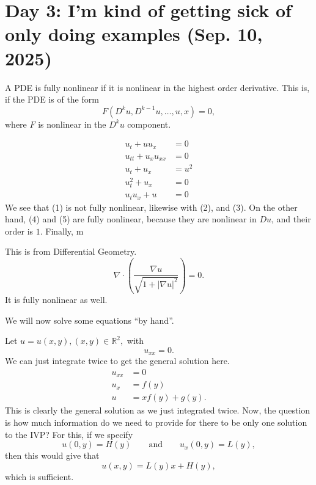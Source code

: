 \section{Day 3: I'm kind of getting sick of only doing examples (Sep. 10, 2025)}
\begin{definition}
	A PDE is fully nonlinear if it is nonlinear in the highest order derivative. This is, if the PDE is of the form
	\[ F(D^{k}u, D^{k-1}u, \ldots, u, x) = 0, \]
	where \( F \) is nonlinear in the \( D^{k}u \) component.
\end{definition}

\begin{example}
	\begin{align}
		u_{t} + u u_{x} &= 0 \\
		u_{tt} + u_{x} u_{x x} &= 0 \\
		u_{t} + u_{x} &= u^{2} \\
		u_{t}^{2} + u_{x} &= 0 \\
		u_{t}u_{x} + u &= 0
	\end{align}
	We see that (1) is not fully nonlinear, likewise with (2), and (3). On the other hand, (4) and (5) are fully nonlinear, because they are nonlinear in \( Du \), and their order is \( 1 \). Finally, m
\end{example}

\begin{example}
	This is from Differential Geometry.
	\[ \nabla \cdot \left( \frac{\nabla u}{\sqrt{1 + | \nabla u|^{2}}} \right) = 0. \]
	It is fully nonlinear as well.
\end{example}

\noindent We will now solve some equations ``by hand''.
\begin{example}
	Let \( u = u(x, y), (x, y) \in \mathbb{R}^{2}, \) with
	\[ u_{x x} = 0. \]
	We can just integrate twice to get the general solution here.
	\begin{align*}
		u_{x x} &= 0 \\
		u_{x} &= f(y) \\
		u &= x f(y) + g(y).
	\end{align*}
	This is clearly the general solution as we just integrated twice. Now, the question is how much information do we need to provide for there to be only one solution to the IVP? For this, if we specify
	\[ u(0, y) = H(y) \qquad \text{and} \qquad u_{x}(0, y) = L(y),\]
	then this would give that
	\[ u(x, y) = L(y) x + H(y), \]
	which is sufficient.
\end{example}

